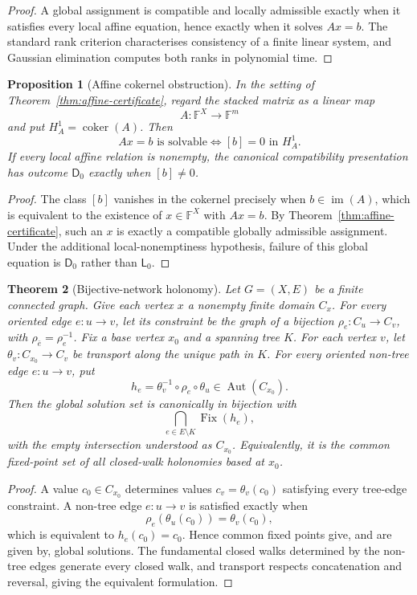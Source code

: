 \documentclass[11pt]{article}
\theoremstyle{plain}
\newtheorem{theorem}{Theorem}[section]
\newtheorem{proposition}[theorem]{Proposition}
\theoremstyle{definition}
\theoremstyle{remark}
\begin{document}
\begin{proof}
A global assignment is compatible and locally admissible exactly when it
satisfies every local affine equation, hence exactly when it solves $Ax=b$.
The standard rank criterion characterises consistency of a finite linear system,
and Gaussian elimination computes both ranks in polynomial time.
\end{proof}


\begin{proposition}[Affine cokernel obstruction]\label{prop:affine-cokernel}
In the setting of Theorem~\ref{thm:affine-certificate}, regard the stacked
matrix as a linear map
\[
A:\mathbb F^X\longrightarrow\mathbb F^m
\]
and put $H_A^1=\operatorname{coker}(A)$. Then
\[
Ax=b\text{ is solvable}
\iff [b]=0\text{ in }H_A^1.
\]
If every local affine relation is nonempty, the canonical compatibility
presentation has outcome $\mathsf D_0$ exactly when $[b]\ne0$.
\end{proposition}

\begin{proof}
The class $[b]$ vanishes in the cokernel precisely when
$b\in\operatorname{im}(A)$, which is equivalent to the existence of
$x\in\mathbb F^X$ with $Ax=b$. By Theorem~\ref{thm:affine-certificate}, such an
$x$ is exactly a compatible globally admissible assignment. Under the additional
local-nonemptiness hypothesis, failure of this global equation is
$\mathsf D_0$ rather than $\mathsf L_0$.
\end{proof}

\begin{theorem}[Bijective-network holonomy]
\label{thm:network-holonomy}
Let $G=(X,E)$ be a finite connected graph. Give each vertex $x$ a nonempty
finite domain $C_x$. For every oriented edge $e:u\to v$, let its constraint be
the graph of a bijection $\rho_e:C_u\to C_v$, with
$\rho_{\bar e}=\rho_e^{-1}$. Fix a base vertex $x_0$ and a spanning tree $K$.
For each vertex $v$, let $\theta_v:C_{x_0}\to C_v$ be transport along the
unique path in $K$. For every oriented non-tree edge $e:u\to v$, put
\[
h_e=\theta_v^{-1}\circ\rho_e\circ\theta_u
\in\operatorname{Aut}(C_{x_0}).
\]
Then the global solution set is canonically in bijection with
\[
\bigcap_{e\in E\setminus K}\operatorname{Fix}(h_e),
\]
with the empty intersection understood as $C_{x_0}$.
Equivalently, it is the common fixed-point set of all closed-walk holonomies
based at $x_0$.
\end{theorem}

\begin{proof}
A value $c_0\in C_{x_0}$ determines values
$c_v=\theta_v(c_0)$ satisfying every tree-edge constraint. A non-tree edge
$e:u\to v$ is satisfied exactly when
\[
\rho_e(\theta_u(c_0))=\theta_v(c_0),
\]
which is equivalent to $h_e(c_0)=c_0$. Hence common fixed points give, and are
given by, global solutions. The fundamental closed walks determined by the
non-tree edges generate every closed walk, and transport respects concatenation
and reversal, giving the equivalent formulation.
\end{proof}
\end{document}
